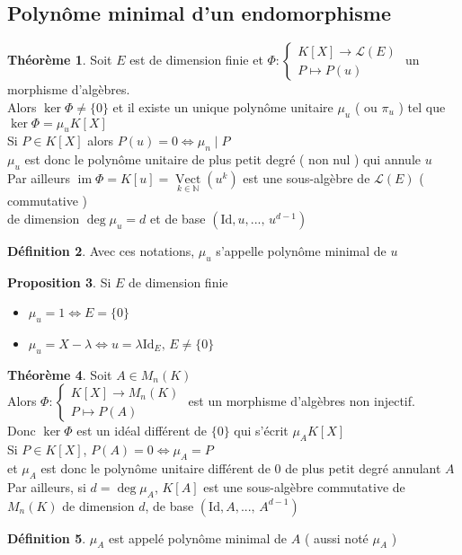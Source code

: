 \documentclass[10pt,a4paper]{article}
\theoremstyle{definition}
\newtheorem{proposition}{Proposition}[section]
\newtheorem{theorem}[proposition]{Théorème}
\newtheorem{definition}[proposition]{Définition}
\DeclareMathOperator*{\Vect}{Vect}
\DeclareMathOperator{\im}{im}
\begin{document}
\subsection{Polynôme minimal d'un endomorphisme}
\begin{theorem}
Soit $E$ est de dimension finie et $\Phi: \begin{cases}
K[X] \to \mathcal{L}(E) \\
P \mapsto P(u) \end{cases}$ un morphisme d'algèbres. \\
Alors $\ker \Phi \neq \{ 0 \}$ et il existe un unique polynôme unitaire $\mu_u$ ( ou $\pi_u$ ) tel que $\ker \Phi = \mu_u K[X] $ \\
Si $P \in K[X]$ alors $P(u) = 0 \iff \mu_n \mid P$ \\
$\mu_u$ est donc le polynôme unitaire de plus petit degré ( non nul ) qui annule $u$ \\
Par ailleurs $\im \Phi = K[u] = \Vect\limits_{k \in \mathbb{N}}(u^k)$ est une sous-algèbre de $\mathcal{L}(E)$ ( commutative ) \\ de dimension $\deg \mu_u = d$ et  de base $( \text{Id}, u, ...,\, u^{d - 1} )$
\end{theorem}
\begin{definition}
Avec ces notations, $\mu_u$ s'appelle polynôme minimal de $u$
\end{definition}
\begin{proposition}
Si $E$ de dimension finie \begin{itemize}
\item $\boxed{\mu_u = 1 \iff E = \{ 0 \}}$
\item $\boxed{\mu_u = X - \lambda \iff u = \lambda \text{Id}_E,\, E \neq \{ 0 \}}$
\end{itemize}
\end{proposition}
\begin{theorem}
Soit $A \in M_n(K)$ \\
Alors $\Phi : \begin{cases}
K[X] \to M_n(K) \\
P \mapsto P(A)
\end{cases}$ est un morphisme d'algèbres non injectif. \\
Donc $\ker \Phi$ est un idéal différent de $\{ 0 \}$ qui s'écrit $\mu_A K[X]$ \\
Si $P \in K[X]$, $P(A) = 0 \iff \mu_A = P$ \\
et $\mu_A$ est donc le polynôme unitaire différent de $0$ de plus petit degré annulant $A$ \\
Par ailleurs, si $d = \deg \mu_A$, $K[A]$ est une sous-algèbre commutative de $M_n(K)$ de dimension $d$, de base $( \text{Id}, A, ...,\, A^{d - 1})$
\end{theorem}
\begin{definition}
$\mu_A$ est appelé polynôme minimal de $A$ ( aussi noté $\mu_A$ )
\end{definition}
\end{document}
